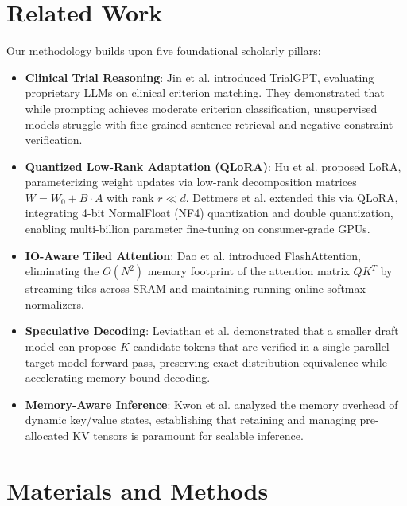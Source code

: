 \documentclass[conference]{IEEEtran}
\begin{document}
\section{Related Work}
Our methodology builds upon five foundational scholarly pillars:
\begin{itemize}
    \item \textbf{Clinical Trial Reasoning}: Jin et al. \cite{jin2024trialgpt} introduced TrialGPT, evaluating proprietary LLMs on clinical criterion matching. They demonstrated that while prompting achieves moderate criterion classification, unsupervised models struggle with fine-grained sentence retrieval and negative constraint verification.
    \item \textbf{Quantized Low-Rank Adaptation (QLoRA)}: Hu et al. \cite{hu2022lora} proposed LoRA, parameterizing weight updates via low-rank decomposition matrices $W = W_0 + B \cdot A$ with rank $r \ll d$. Dettmers et al. \cite{dettmers2023qlora} extended this via QLoRA, integrating 4-bit NormalFloat (NF4) quantization and double quantization, enabling multi-billion parameter fine-tuning on consumer-grade GPUs.
    \item \textbf{IO-Aware Tiled Attention}: Dao et al. \cite{dao2022flashattention} introduced FlashAttention, eliminating the $O(N^2)$ memory footprint of the attention matrix $QK^T$ by streaming tiles across SRAM and maintaining running online softmax normalizers.
    \item \textbf{Speculative Decoding}: Leviathan et al. \cite{leviathan2023speculative} demonstrated that a smaller draft model can propose $K$ candidate tokens that are verified in a single parallel target model forward pass, preserving exact distribution equivalence while accelerating memory-bound decoding.
    \item \textbf{Memory-Aware Inference}: Kwon et al. \cite{kwon2023vllm} analyzed the memory overhead of dynamic key/value states, establishing that retaining and managing pre-allocated KV tensors is paramount for scalable inference.
\end{itemize}

\section{Materials and Methods}
\end{document}
